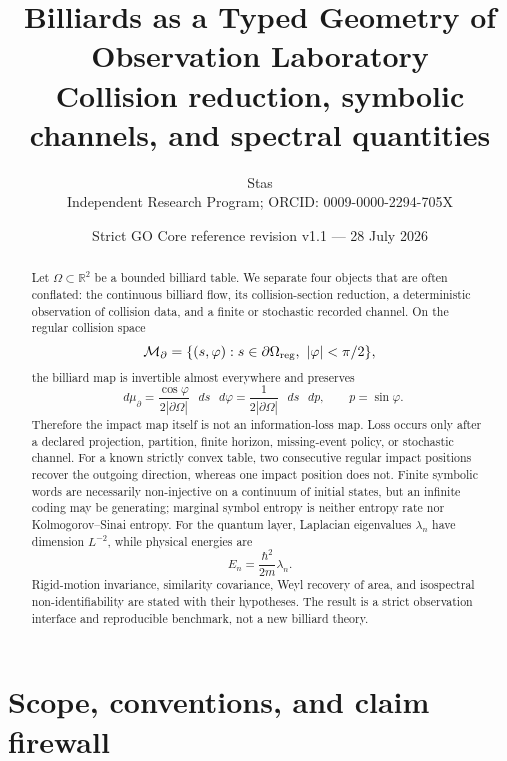 \documentclass[11pt,a4paper]{article}
\title{\bfseries Billiards as a Typed Geometry of Observation Laboratory\\
\large Collision reduction, symbolic channels, and spectral quantities}
\author{Stas\\
\small Independent Research Program; ORCID: 0009-0000-2294-705X}
\date{Strict GO Core reference revision v1.1 --- 28 July 2026}
\theoremstyle{definition}
\theoremstyle{plain}
\theoremstyle{remark}
\newcommand{\R}{\mathbb{R}}
\newcommand{\dd}{\mathop{}\!d}
\newcommand{\Mcal}{\mathcal M}
\begin{document}
\maketitle

\begin{center}
\end{center}

\begin{abstract}
Let \(\Omega\subset\R^2\) be a bounded billiard table. We separate four
objects that are often conflated: the continuous billiard flow, its
collision-section reduction, a deterministic observation of collision
data, and a finite or stochastic recorded channel. On the regular
collision space
\[
\Mcal_\partial=\{(s,\varphi):s\in\partial\Omega_{\rm reg},
\ |\varphi|<\pi/2\},
\]
the billiard map is invertible almost everywhere and preserves
\[
\dd\mu_\partial
=\frac{\cos\varphi}{2|\partial\Omega|}\,\dd s\,\dd\varphi
=\frac{1}{2|\partial\Omega|}\,\dd s\,\dd p,
\qquad p=\sin\varphi.
\]
Therefore the impact map itself is not an information-loss map.
Loss occurs only after a declared projection, partition, finite
horizon, missing-event policy, or stochastic channel. For a known
strictly convex table, two consecutive regular impact positions
recover the outgoing direction, whereas one impact position does not.
Finite symbolic words are necessarily non-injective on a continuum
of initial states, but an infinite coding may be generating; marginal
symbol entropy is neither entropy rate nor Kolmogorov--Sinai entropy.
For the quantum layer, Laplacian eigenvalues
\(\lambda_n\) have dimension \(L^{-2}\), while physical energies are
\[
E_n=\frac{\hbar^2}{2m}\lambda_n.
\]
Rigid-motion invariance, similarity covariance, Weyl recovery of area,
and isospectral non-identifiability are stated with their hypotheses.
The result is a strict observation interface and reproducible
benchmark, not a new billiard theory.
\end{abstract}

\tableofcontents

\section{Scope, conventions, and claim firewall}
\end{document}

